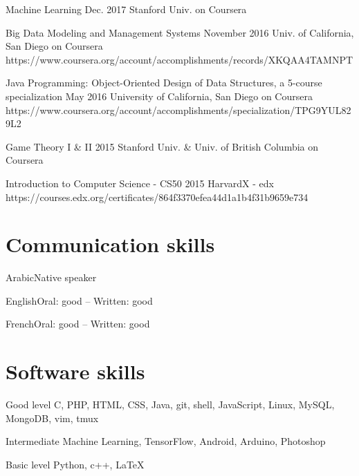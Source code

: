 \documentclass{tccv}
\begin{document}
\begin{yearlist}

\item{Machine Learning}
     {Dec. 2017}
     {}
     {Stanford Univ. on Coursera}
     {}


\item
    {Big Data Modeling and Management Systems}
    {November 2016}
    {}
    {Univ. of California, San Diego on Coursera}
    {https://www.coursera.org/account/accomplishments/records/XKQAA4TAMNPT}



\item
    {Java Programming: Object-Oriented Design of Data Structures, a 5-course specialization}
    {May 2016}
    {}
    {University of California, San Diego on Coursera}
    {https://www.coursera.org/account/accomplishments/specialization/TPG9YUL829L2}

\item
    {Game Theory I \& II}
    {2015}
    {}
    {Stanford Univ. \& Univ. of British Columbia on Coursera}
    {}

\item
    {Introduction to Computer Science - CS50}
    {2015}
    {}
    {HarvardX - edx}
    {https://courses.edx.org/certificates/864f3370efea44d1a1b4f31b9659e734}

\end{yearlist}


\section{Communication skills}

\begin{factlist}
\item{Arabic}{Native speaker}
\item{English}{Oral: good -- Written: good}
\item{French}{Oral: good -- Written: good}
\end{factlist}

\section{Software skills}

\begin{factlist}

\item{Good level}
     {C, PHP, HTML, CSS, Java, git, shell,
      JavaScript, Linux, MySQL, MongoDB, vim, tmux}

\item{Intermediate}
     {Machine Learning, TensorFlow, Android, Arduino, Photoshop}

\item{Basic level}
     {Python, c++, \LaTeX}

\end{factlist}
\end{document}
